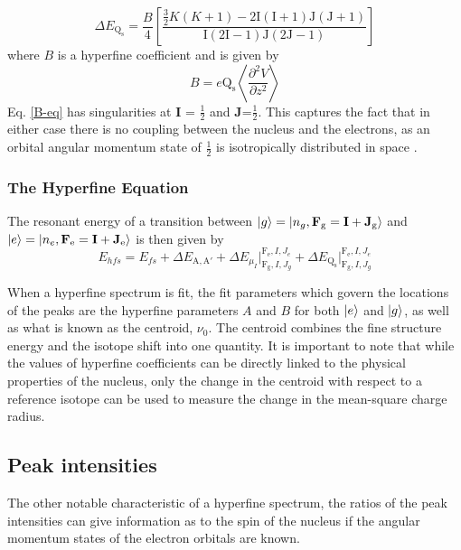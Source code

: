 \documentclass[12pt,a4paper,margin=1in]{report}
\begin{document}
\begin{equation}
\Delta E_{\mathrm{Q_s}} = \frac{B}{4}\left[\frac{\frac{3}{2}K(K+1)-2\mathrm{I}(\mathrm{I}+1)\mathrm{J}(\mathrm{J}+1)}{\mathrm{I}(2\mathrm{I}-1)\mathrm{J}(2\mathrm{J}-1)}\right]
\label{B-eq}
\end{equation}
where $B$ is a hyperfine coefficient and is given by
\begin{equation}
B = e\mathrm{Q_s}\left\langle\frac{\partial^2V}{\partial z^2} \right\rangle
\end{equation}
Eq. \ref{B-eq} has singularities at \textbf{I} = $\frac{1}{2}$ and \textbf{J}=$\frac{1}{2}$. This captures the fact that in either case there is no coupling between the nucleus and the electrons, as an orbital angular momentum state of $\frac{1}{2}$ is isotropically distributed in space .

\subsubsection*{The Hyperfine Equation}
The resonant energy of a transition between $\ket{g}=\ket{n_g,\mathrm{\textbf{F}_g=\textbf{I} + \textbf{J}_g}}$ and $\ket{e}=\ket{n_e,\mathrm{\textbf{F}_e=\textbf{I} + \textbf{J}_e}}$ is then given by
\begin{equation}
E_{hfs} = E_{fs} +  \Delta E_{\mathrm{A,A'}}+\Delta E_{\mu_I}\Bigr|_{\mathrm{F_g},I,J_g}^{\mathrm{F_e},I,J_e}+\Delta E_{\mathrm{Q_s}}\Bigr|_{\mathrm{F_g},I,J_g}^{\mathrm{F_e},I,J_e}
\end{equation}

When a hyperfine spectrum is fit, the fit parameters which govern the locations of the peaks are the hyperfine parameters $A$ and $B$ for both $\ket{e}$ and $\ket{g}$, as well as what is known as the centroid, $\nu_0$. The centroid combines the fine structure energy and the isotope shift into one quantity. It is important to note that while the values of hyperfine coefficients can be directly linked to the physical properties of the nucleus, only the change in the centroid with respect to a reference isotope can be used to measure the change in the mean-square charge radius.

\subsection{Peak intensities} 
The other notable characteristic of a hyperfine spectrum, the ratios of the peak intensities can give information as to the spin of the nucleus if the angular momentum states of the electron orbitals are known. 
\end{document}
